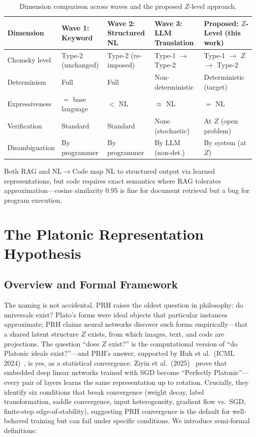 \documentclass[11pt]{article}
\theoremstyle{definition}
\begin{document}
\begin{table}[t]
\centering
\caption{Dimension comparison across waves and the proposed $Z$-level approach.}
\label{tab:waves}
\small
\begin{tabularx}{\textwidth}{l L L L L}
\toprule
\textbf{Dimension} & \textbf{Wave 1: Keyword} & \textbf{Wave 2: Structured NL} & \textbf{Wave 3: LLM Translation} & \textbf{Proposed: $Z$-Level (this work)} \\
\midrule
Chomsky level & Type-2 (unchanged) & Type-2 (re-imposed) & Type-1 $\to$ Type-2 & Type-1 $\to$ $Z$ $\to$ Type-2 \\
Determinism & Full & Full & Non-deterministic & Deterministic (target) \\
Expressiveness & $=$ base language & $<$ NL & $\approx$ NL & $=$ NL \\
Verification & Standard & Standard & None (stochastic) & At $Z$ (open problem) \\
Disambiguation & By programmer & By programmer & By LLM (non-det.) & By system (at $Z$) \\
\bottomrule
\end{tabularx}
\end{table}

Both RAG and NL$\to$Code map NL to structured output via learned representations, but code requires exact semantics where RAG tolerates approximation---cosine similarity $0.95$ is fine for document retrieval but a bug for program execution.


\section{The Platonic Representation Hypothesis}\label{sec:prh}

\subsection{Overview and Formal Framework}

The naming is not accidental. PRH raises the oldest question in philosophy: do universals exist? Plato's forms were ideal objects that particular instances approximate; PRH claims neural networks discover such forms empirically---that a shared latent structure $Z$ exists, from which images, text, and code are projections. The question ``does $Z$ exist?'' is the computational version of ``do Platonic ideals exist?''---and PRH's answer, supported by Huh et al.\ (ICML 2024)~\cite{huh2024platonic}, is yes, as a statistical convergence. Ziyin et al.\ (2025)~\cite{ziyin2025proof} prove that embedded deep linear networks trained with SGD become ``Perfectly Platonic''---every pair of layers learns the same representation up to rotation. Crucially, they identify six conditions that break convergence (weight decay, label transformation, saddle convergence, input heterogeneity, gradient flow vs.\ SGD, finite-step edge-of-stability), suggesting PRH convergence is the default for well-behaved training but can fail under specific conditions. We introduce semi-formal definitions:
\end{document}
